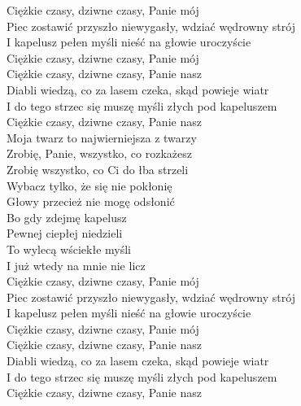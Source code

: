 
Ciężkie czasy, dziwne czasy, Panie mój \tab{}\\
Piec zostawić przyszło niewygasły, wdziać wędrowny strój  \\
I kapelusz pełen myśli nieść na głowie uroczyście \\
Ciężkie czasy, dziwne czasy, Panie mój \tab{}\\
\hops
Ciężkie czasy, dziwne czasy, Panie nasz \\
Diabli wiedzą, co za lasem czeka, skąd powieje wiatr \\
I do tego strzec się muszę myśli złych pod kapeluszem \\
Ciężkie czasy, dziwne czasy, Panie nasz \\
\hops
{} Moja twarz to najwierniejsza z twarzy \\
 Zrobię, Panie, wszystko, co rozkażesz \\
 Zrobię wszystko, co Ci do łba strzeli \\
 Wybacz tylko, że się nie pokłonię \\
 Głowy przecież nie mogę odsłonić \\
\hops
{} Bo gdy zdejmę kapelusz \tab{} \\
 Pewnej ciepłej niedzieli \tab{}\\
 To wylecą wściekłe myśli \tab{}\\
 I już wtedy na mnie nie licz \\
\hops
Ciężkie czasy, dziwne czasy, Panie mój \\
Piec zostawić przyszło niewygasły, wdziać wędrowny strój \\
I kapelusz pełen myśli nieść na głowie uroczyście \\
Ciężkie czasy, dziwne czasy, Panie mój \\
\hops
Ciężkie czasy, dziwne czasy, Panie nasz \\
Diabli wiedzą, co za lasem czeka, skąd powieje wiatr \\
I do tego strzec się muszę myśli złych pod kapeluszem \\
Ciężkie czasy, dziwne czasy, Panie nasz 
